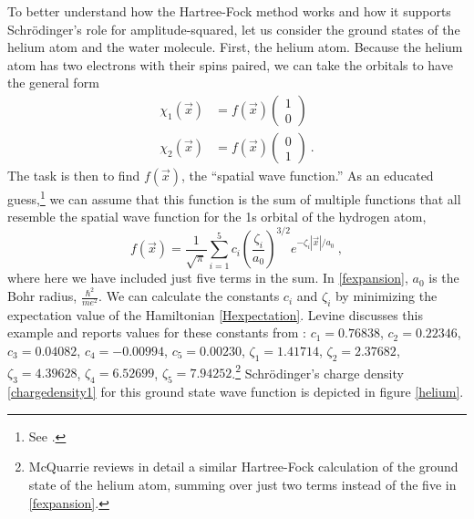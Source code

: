 \documentclass[12pt,onecolumn,secnumarabic,amsmath,amssymb,balancelastpage,nofootinbib]{article}
\begin{document}
To better understand how the Hartree-Fock method works and how it supports Schr\"{o}dinger's role for amplitude-squared, let us consider the ground states of the helium atom and the water molecule.  First, the helium atom.  Because the helium atom has two electrons with their spins paired, we can take the orbitals to have the general form
\begin{align}
\chi_1(\vec{x})&=f(\vec{x})\left(
\begin{matrix}
1 \\
0
\end{matrix}
\right)
\nonumber
\\
\chi_2(\vec{x})&=f(\vec{x})\left(
\begin{matrix}
0 \\
1
\end{matrix}
\right)
\ .
\label{twoorbitals}
\end{align}
The task is then to find $f(\vec{x})$, the ``spatial wave function.''  As an educated guess,\footnote{See \cite[sec.\ 9.4 and 11.1]{levineQC}.} we can assume that this function is the sum of multiple functions that all resemble the spatial wave function for the 1s orbital of the hydrogen atom,
\begin{equation}
f(\vec{x})=\frac{1}{\sqrt{\pi}} \sum_{i=1}^{5} c_i \left(\frac{\zeta_i}{a_0}\right)^{3/2}e^{-\zeta_i |\vec{x}| / a_0}\ ,
\label{fexpansion}
\end{equation}
where here we have included just five terms in the sum.  In \eqref{fexpansion}, $a_0$ is the Bohr radius, $\frac{\hbar^2}{m e^2}$.  We can calculate the constants $c_i$ and $\zeta_i$ by minimizing the expectation value of the Hamiltonian \eqref{Hexpectation}.  Levine \cite[sec.\ 11.1]{levineQC} discusses this example and reports values for these constants from \cite{clementi1974}: $c_1=0.76838$, $c_2=0.22346$, $c_3=0.04082$, $c_4=-0.00994$, $c_5=0.00230$, $\zeta_1=1.41714$, $\zeta_2=2.37682$, $\zeta_3=4.39628$, $\zeta_4=6.52699$, $\zeta_5=7.94252$.\footnote{McQuarrie \cite[pg.\ 482--489]{mcquarrieQC} reviews in detail a similar Hartree-Fock calculation of the ground state of the helium atom, summing over just two terms instead of the five in \eqref{fexpansion}.}  Schr\"{o}dinger's charge density \eqref{chargedensity1} for this ground state wave function is depicted in figure \ref{helium}.
\end{document}
